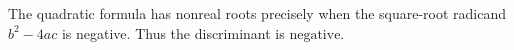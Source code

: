 The quadratic formula has nonreal roots precisely when the square-root radicand $b^2-4ac$ is negative. Thus the discriminant is $\boxed{\text{negative}}$.
